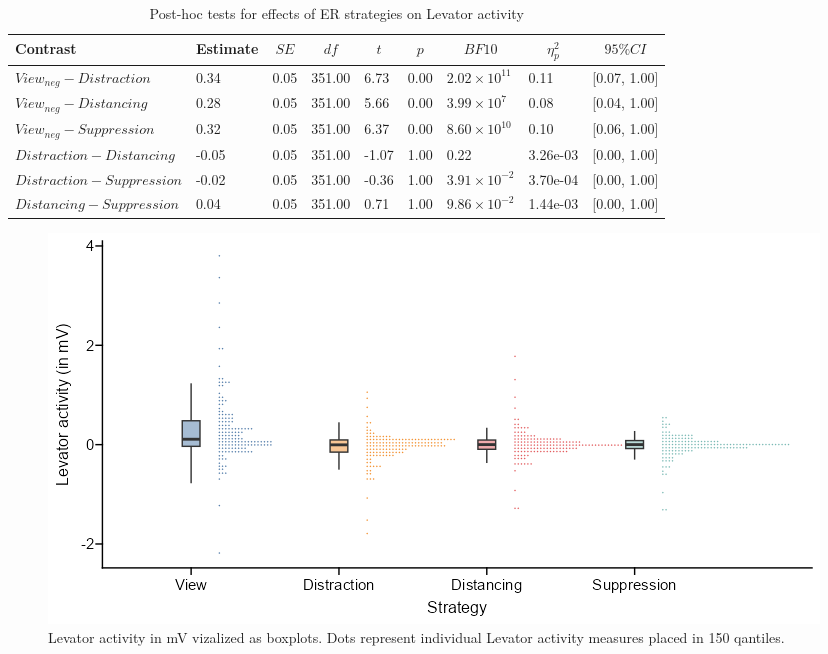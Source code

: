 \documentclass[
  man,floatsintext]{apa6}
\begin{document}
\begin{table}[H]

\begin{center}
\begin{threeparttable}

\caption{\label{tab:SupplEffectLevReg}Post-hoc tests for effects of ER strategies on Levator activity}

\footnotesize{

\begin{tabular}{lllllllll}
\toprule
Contrast & \multicolumn{1}{c}{Estimate} & \multicolumn{1}{c}{$SE$} & \multicolumn{1}{c}{$df$} & \multicolumn{1}{c}{$t$} & \multicolumn{1}{c}{$p$} & \multicolumn{1}{c}{$BF10$} & \multicolumn{1}{c}{$\eta_{p}^{2}$} & \multicolumn{1}{c}{$95\% CI$}\\
\midrule
$View_{neg} - Distraction$ & 0.34 & 0.05 & 351.00 & 6.73 & 0.00 & $2.02 \times 10^{11}$ & 0.11 & {}[0.07, 1.00]\\
$View_{neg} - Distancing$ & 0.28 & 0.05 & 351.00 & 5.66 & 0.00 & $3.99 \times 10^{7}$ & 0.08 & {}[0.04, 1.00]\\
$View_{neg} - Suppression$ & 0.32 & 0.05 & 351.00 & 6.37 & 0.00 & $8.60 \times 10^{10}$ & 0.10 & {}[0.06, 1.00]\\
$Distraction - Distancing$ & -0.05 & 0.05 & 351.00 & -1.07 & 1.00 & 0.22 & 3.26e-03 & {}[0.00, 1.00]\\
$Distraction - Suppression$ & -0.02 & 0.05 & 351.00 & -0.36 & 1.00 & $3.91 \times 10^{-2}$ & 3.70e-04 & {}[0.00, 1.00]\\
$Distancing - Suppression$ & 0.04 & 0.05 & 351.00 & 0.71 & 1.00 & $9.86 \times 10^{-2}$ & 1.44e-03 & {}[0.00, 1.00]\\
\bottomrule
\end{tabular}

}

\end{threeparttable}
\end{center}

\end{table}

\begin{figure}[H]
\includegraphics[width=\textwidth]{figures/FigLevReg} \caption{Levator activity in mV vizalized as boxplots. Dots represent individual Levator activity measures placed in 150 qantiles.}\label{fig:SupplFigLevReg}
\end{figure}
\newpage
\end{document}
